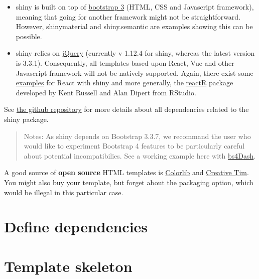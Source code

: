 \documentclass[]{book}
\providecommand{\tightlist}{%
  \setlength{\itemsep}{0pt}\setlength{\parskip}{0pt}}
\begin{document}
\begin{itemize}
\tightlist
\item
  shiny is built on top of \href{https://getbootstrap.com/docs/3.3/}{bootstrap 3} (HTML, CSS and Javascript framework), meaning that going for another framework might
  not be straightforward. However, shinymaterial and shiny.semantic are examples showing
  this can be possible.
\item
  shiny relies on \href{https://jquery.com}{jQuery} (currently v 1.12.4 for shiny, whereas the latest version is 3.3.1). Consequently, all templates based upon React, Vue and other Javascript framework will not be natively supported. Again, there exist some \href{https://github.com/alandipert/react-widget-demo/blob/master/app.R}{examples} for React with shiny and more generally,
  the \href{https://react-r.github.io/reactR/}{reactR} package developed by Kent Russell and Alan Dipert from RStudio.
\end{itemize}

See \href{https://github.com/rstudio/shiny/tree/master/inst/www/shared}{the github repository} for more details about all dependencies related to the shiny package.

\begin{quote}
Notes: As shiny depends on Bootstrap 3.3.7, we recommand the user who would like to
experiment Bootstrap 4 features to be particularly careful about potential incompatibilies. See a working example here with \href{https://github.com/RinteRface/bs4Dash}{bs4Dash}.
\end{quote}

A good source of \textbf{open source} HTML templates is \href{https://colorlib.com}{Colorlib} and \href{https://www.creative-tim.com/bootstrap-themes/free}{Creative Tim}. You might also buy your template, but forget about the packaging option, which would be illegal in this particular case.

\hypertarget{custom-templates-dependencies}{%
\chapter{Define dependencies}\label{custom-templates-dependencies}}

\hypertarget{custom-templates-skeleton}{%
\chapter{Template skeleton}\label{custom-templates-skeleton}}
\end{document}
